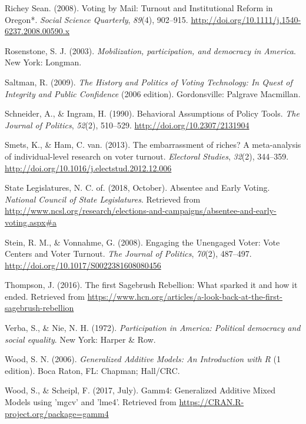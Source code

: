 \documentclass[12pt,twoside]{reedthesis}
\begin{document}
  \hypertarget{ref-richey_sean_voting_2008}{}
  Richey Sean. (2008). Voting by Mail: Turnout and Institutional Reform in
  Oregon*. \emph{Social Science Quarterly}, \emph{89}(4), 902--915.
  \url{http://doi.org/10.1111/j.1540-6237.2008.00590.x}
  
  \hypertarget{ref-rosenstone_mobilization_2003}{}
  Rosenstone, S. J. (2003). \emph{Mobilization, participation, and
  democracy in America}. New York: Longman.
  
  \hypertarget{ref-saltman_history_2009}{}
  Saltman, R. (2009). \emph{The History and Politics of Voting Technology:
  In Quest of Integrity and Public Confidence} (2006 edition).
  Gordonsville: Palgrave Macmillan.
  
  \hypertarget{ref-schneider_behavioral_1990}{}
  Schneider, A., \& Ingram, H. (1990). Behavioral Assumptions of Policy
  Tools. \emph{The Journal of Politics}, \emph{52}(2), 510--529.
  \url{http://doi.org/10.2307/2131904}
  
  \hypertarget{ref-smets_embarrassment_2013}{}
  Smets, K., \& Ham, C. van. (2013). The embarrassment of riches? A
  meta-analysis of individual-level research on voter turnout.
  \emph{Electoral Studies}, \emph{32}(2), 344--359.
  \url{http://doi.org/10.1016/j.electstud.2012.12.006}
  
  \hypertarget{ref-national_council_of_state_legislatures_absentee_2018}{}
  State Legislatures, N. C. of. (2018, October). Absentee and Early
  Voting. \emph{National Council of State Legislatures}. Retrieved from
  \url{http://www.ncsl.org/research/elections-and-campaigns/absentee-and-early-voting.aspx\#a}
  
  \hypertarget{ref-stein_engaging_2008}{}
  Stein, R. M., \& Vonnahme, G. (2008). Engaging the Unengaged Voter: Vote
  Centers and Voter Turnout. \emph{The Journal of Politics}, \emph{70}(2),
  487--497. \url{http://doi.org/10.1017/S0022381608080456}
  
  \hypertarget{ref-thompson_first_2016}{}
  Thompson, J. (2016). The first Sagebrush Rebellion: What sparked it and
  how it ended. Retrieved from
  \url{https://www.hcn.org/articles/a-look-back-at-the-first-sagebrush-rebellion}
  
  \hypertarget{ref-verba_participation_1972}{}
  Verba, S., \& Nie, N. H. (1972). \emph{Participation in America:
  Political democracy and social equality}. New York: Harper \& Row.
  
  \hypertarget{ref-wood_generalized_2006}{}
  Wood, S. N. (2006). \emph{Generalized Additive Models: An Introduction
  with R} (1 edition). Boca Raton, FL: Chapman; Hall/CRC.
  
  \hypertarget{ref-wood_gamm4:_2017}{}
  Wood, S., \& Scheipl, F. (2017, July). Gamm4: Generalized Additive Mixed
  Models using 'mgcv' and 'lme4'. Retrieved from
  \url{https://CRAN.R-project.org/package=gamm4}


\end{document}
